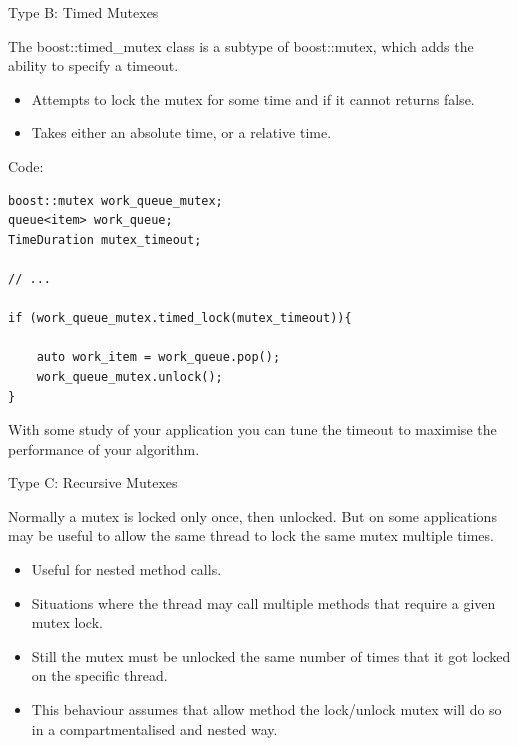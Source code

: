 \documentclass[8pt]{beamer}
\begin{document}
\begin{frame}[fragile]{Type B: Timed Mutexes}
 
The boost::timed\_mutex class is a subtype of boost::mutex, which adds the ability to specify a timeout. 
\begin{itemize}
  \item Attempts to lock the mutex for some time and if it cannot returns false.
  \item Takes either an absolute time, or a relative time.
\end{itemize}


\begin{exampleblock}{Code:}
 
\begin{lstlisting}
boost::mutex work_queue_mutex;
queue<item> work_queue;
TimeDuration mutex_timeout;

// ...

if (work_queue_mutex.timed_lock(mutex_timeout)){

    auto work_item = work_queue.pop();
    work_queue_mutex.unlock();
}
\end{lstlisting}

\end{exampleblock}

With some study of your application you can tune the timeout to maximise the performance of your algorithm.

\end{frame}

\begin{frame}[fragile]{Type C: Recursive Mutexes}
 
Normally a mutex is locked only once, then unlocked. But on some applications may be useful to allow the same thread to lock the same mutex multiple times.
\begin{itemize}
 \item Useful for nested method calls.
 \item Situations where the thread may call multiple methods that require a given mutex lock.
 \item Still the mutex must be unlocked the same number of times that it got locked on the specific thread.
 \item This behaviour assumes that allow method the lock/unlock mutex will do so in a compartmentalised and nested way. 
\end{itemize}
 
\end{frame}
\end{document}
